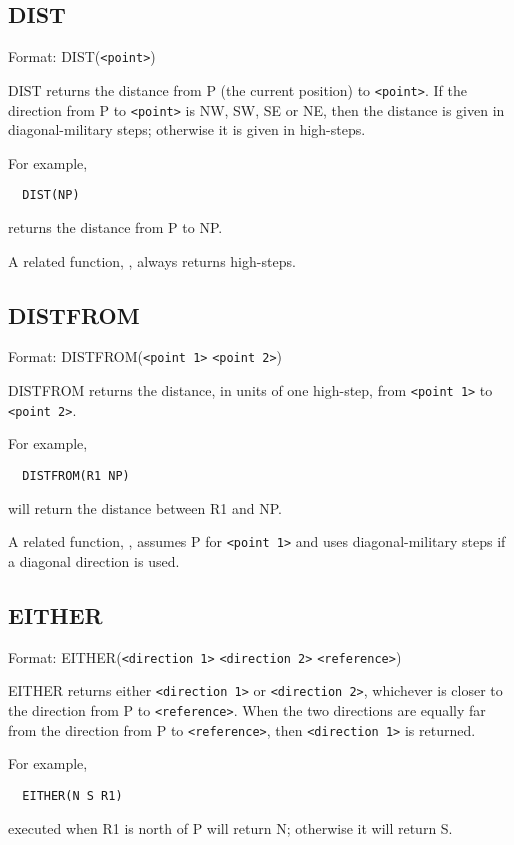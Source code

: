 \subsection{DIST}\label{dist}

Format: DIST(\verb$<point>$)

DIST returns the distance from P (the current position) to \verb$<point>$.
If the direction from P to \verb$<point>$ is NW, SW, SE or NE, then the
distance is given in diagonal-military steps; otherwise it is given in
high-steps.

For example,
\begin{verbatim}
  DIST(NP)
\end{verbatim}
returns the distance from P to NP.

A related function, , always returns high-steps.

\subsection{DISTFROM}\label{distfrom}

Format: DISTFROM(\verb$<point 1>$ \verb$<point 2>$)

DISTFROM returns the distance, in units of one high-step, from \verb$<point 1>$
to \verb$<point 2>$.

For example,
\begin{verbatim}
  DISTFROM(R1 NP)
\end{verbatim}
will return the distance between R1 and NP.

A related function, , assumes P for \verb$<point 1>$ and
uses diagonal-military steps if a diagonal direction is used.

\subsection{EITHER}\label{either}

Format: EITHER(\verb$<direction 1>$ \verb$<direction 2>$ \verb$<reference>$)

EITHER returns either \verb$<direction 1>$ or \verb$<direction 2>$, whichever
is closer to the direction from P to \verb$<reference>$.  When the two
directions are equally far from the direction from P to \verb$<reference>$,
then \verb$<direction 1>$ is returned.

For example,
\begin{verbatim}
  EITHER(N S R1)
\end{verbatim}
executed when R1 is north of P will return N; otherwise it will return S.

